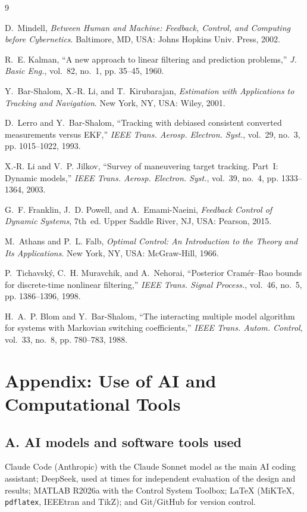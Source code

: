 \documentclass[conference]{IEEEtran}
\begin{document}
\begin{thebibliography}{9}

D.~Mindell, \emph{Between Human and Machine: Feedback, Control, and Computing before Cybernetics}.
Baltimore, MD, USA: Johns Hopkins Univ. Press, 2002.

R.~E. Kalman, ``A new approach to linear filtering and prediction problems,'' \emph{J. Basic Eng.}, vol.~82, no.~1, pp. 35--45, 1960.

Y.~Bar-Shalom, X.-R. Li, and T.~Kirubarajan, \emph{Estimation with Applications to Tracking and Navigation}.
New York, NY, USA: Wiley, 2001.

D.~Lerro and Y.~Bar-Shalom, ``Tracking with debiased consistent converted measurements versus EKF,'' \emph{IEEE Trans. Aerosp. Electron. Syst.}, vol.~29, no.~3, pp. 1015--1022, 1993.

X.-R. Li and V.~P. Jilkov, ``Survey of maneuvering target tracking. Part~I: Dynamic models,'' \emph{IEEE Trans. Aerosp. Electron. Syst.}, vol.~39, no.~4, pp. 1333--1364, 2003.

G.~F. Franklin, J.~D. Powell, and A.~Emami-Naeini, \emph{Feedback Control of Dynamic Systems}, 7th~ed.
Upper Saddle River, NJ, USA: Pearson, 2015.

M.~Athans and P.~L. Falb, \emph{Optimal Control: An Introduction to the Theory and Its Applications}.
New York, NY, USA: McGraw-Hill, 1966.

P.~Tichavsk\'y, C.~H. Muravchik, and A.~Nehorai, ``Posterior Cram\'er--Rao bounds for discrete-time nonlinear filtering,'' \emph{IEEE Trans. Signal Process.}, vol.~46, no.~5, pp. 1386--1396, 1998.

H.~A.~P. Blom and Y.~Bar-Shalom, ``The interacting multiple model algorithm for systems with Markovian switching coefficients,'' \emph{IEEE Trans. Autom. Control}, vol.~33, no.~8, pp. 780--783, 1988.

\end{thebibliography}

\clearpage\onecolumn
\section*{Appendix: Use of AI and Computational Tools}
\subsection*{A. AI models and software tools used}
Claude Code (Anthropic) with the Claude Sonnet model as the main AI coding assistant; DeepSeek, used at times for independent evaluation of the design and results; MATLAB R2026a with the Control System Toolbox; LaTeX (MiKTeX, \texttt{pdflatex}, IEEEtran and TikZ); and Git/GitHub for version control.
\end{document}
